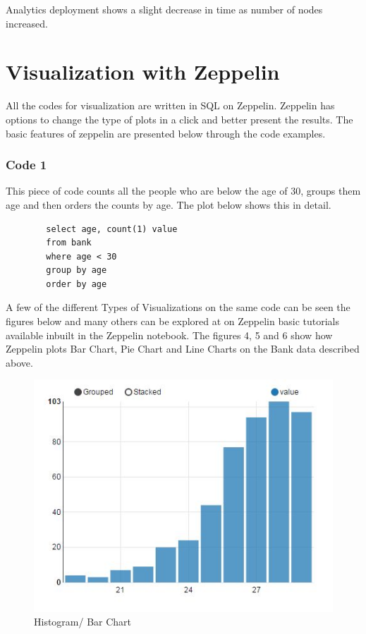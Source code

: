 \documentclass[9pt,twocolumn,twoside]{../../styles/osajnl}
\begin{document}
    Analytics deployment shows a slight decrease in time as number of 
    nodes increased.
	
	\section{Visualization with Zeppelin}
	
	All the codes for visualization are written in SQL on Zeppelin. 
	Zeppelin has options to change the type of plots in a click and 
	better present the results. The basic features of zeppelin are 
	presented below through the code examples.
	
	\subsubsection{Code 1}
	
	This piece of code counts all the people who are below the age of 
	30, groups them age and then orders the counts by age. The plot 
	below shows this in detail.
	
	\begin{verbatim}
		select age, count(1) value
		from bank
		where age < 30
		group by age
		order by age
	\end{verbatim}
	
	A few of the different Types of Visualizations on the same code 
	can be seen the figures below and many others can be explored at 
	on Zeppelin basic tutorials available inbuilt in the Zeppelin 
	notebook. The figures 4, 5 and 6 show how Zeppelin plots Bar 
	Chart, Pie Chart and Line Charts on the Bank data described above.
	
	\begin{figure}
		\includegraphics[width=\linewidth]{./images/code1_1}
		\caption{Histogram/ Bar Chart}
		\label{fig:Histogram}
	\end{figure}
	
\end{document}
